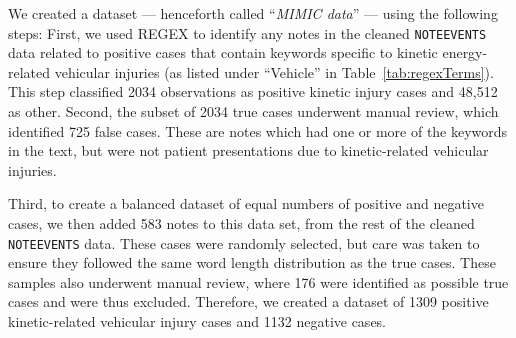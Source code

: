 \documentclass[a4paper,12pt]{article}
\newcommand{\mimicData}{MIMIC data\xspace}   %
\begin{document}
We created a dataset --- henceforth called ``\emph{\mimicData}'' --- using the following steps: First, we used \ac{REGEX} to identify any notes in the cleaned \texttt{NOTEEVENTS} data related to positive cases that contain keywords specific to kinetic energy-related vehicular injuries (as listed under ``Vehicle'' in Table~\ref{tab:regexTerms}). 
This step classified 2034 observations as positive kinetic injury cases and 48,512 as other. Second, the subset of 2034 true cases underwent manual review, which identified 
725 
false cases. These are notes which had one or more of the keywords in the text, but were not patient presentations due to kinetic-related vehicular injuries. 

Third, to create a balanced dataset of equal numbers of positive and negative cases, we then added 583 notes to this data set, from the rest of the cleaned \texttt{NOTEEVENTS} data. 
These cases were randomly selected, but care was taken to ensure they followed the same word length distribution as the true cases. 
These samples also underwent manual review, where 176 were identified as possible true cases  and were thus excluded. 
Therefore, we created a dataset of 1309 positive kinetic-related vehicular injury cases and 1132 negative cases. 
\end{document}
